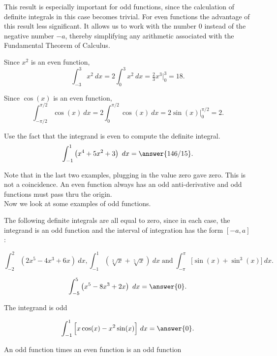 \documentclass{ximera}
\begin{document}
This result is especially important for odd functions, since the calculation of definite integrals in this case
becomes trivial. For even functions the advantage of this result less significant.  It allows us to work with the number
$0$ instead of the negative number $-a$, thereby simplifying any arithmetic associated with the 
Fundamental Theorem of Calculus.

\begin{example}
Since $x^2$ is an even function, 
\[\int_{-3}^3 x^2 \ dx = 2\int_0^3 x^2 \ dx = \tfrac{2}{3}x^3\Bigg|_0^3 = 18.\]
\end{example}

\begin{example}
Since $\cos(x)$ is an even function, 
\[\int_{-\pi/2}^{\pi/2} \cos(x) \ dx = 2\int_0^{\pi/2} \cos(x) \ dx = 2\sin(x)\Bigg|_0^{\pi/2} = 2.\]
\end{example}

\begin{problem}
Use the fact that the integrand is even to compute the definite integral.
\[\int_{-1}^1 \left(x^4 + 5x^2 + 3 \right) \ dx =\answer {146/15}.\]
\end{problem}



Note that in the last two examples, plugging in the value zero gave zero.  This is not a coincidence.
An even function always has an odd anti-derivative and odd functions must pass thru the origin.\\
Now we look at some examples of odd functions.

\begin{example}
The following definite integrals are all equal to zero, since in each case, the integrand is an odd function and the 
interval of integration has the form $[-a, a]$:

\[\int_{-2}^2 \left(2x^5 - 4x^3 + 6x \right)\ dx, \int_{-1}^1 \left(\sqrt[3] x + \sqrt[5]x\right) \ dx  \; \text{and} \; \int_{-\pi}^\pi \Big[\sin(x) + \sin^3(x)\Big] \ dx.\]
\end{example}

\begin{problem}
\[\int_{-5}^5 \left(x^5 - 8x^3 +2x \right) \ dx =\answer {0}.\]
\begin{hint}
The integrand is odd
\end{hint}
\end{problem}

\begin{problem}
\[\int_{-1}^1 \Big[x\cos(x) - x^2\sin(x) \Big] \ dx =\answer {0}.\]
\begin{hint}
An odd function times an even function is an odd function
\end{hint}
\end{problem}
\end{document}
